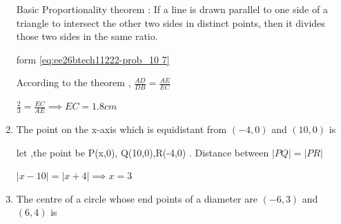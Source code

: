 \begin{enumerate}[label=\thesubsection.\arabic*, ref=\thesubsection.\theenumi]
\begin{center}
	
\end{center}
\solution

Basic Proportionality theorem : If a line is drawn parallel to one side of a triangle to intersect the other two sides in distinct points, then it divides those two sides in the same ratio.

form \eqref{eq:ee26btech11222-prob_10 7}

According to the theorem , $\frac{AD}{DB}=\frac{AE}{EC}$

$\frac{2}{3}= \frac{EC}{AE} \implies EC= 1.8cm $

\item The point on the x-axis which is equidistant from $(-4, 0)$ and $(10, 0)$ is

\begin{enumerate}
	\begin{multicols}{4}
\item $(7, 0)$

\item  $(5, 0)$ 

\item  $(0, 0)$ 

\item  $(3, 0)$
	\end{multicols}
\end{enumerate}	
\solution

let ,the point be P(x,0), Q(10,0),R(-4,0) . Distance between $\vert{}PQ\vert = \vert{}PR\vert{}$ 

$\vert{}x-10\vert{} = \vert{}x+4\vert{} \implies x=3$

\item 

The centre of a circle whose end points of a diameter are $(-6, 3)$ and $(6, 4)$ is   
\begin{enumerate}
\end{enumerate}
\end{enumerate}
